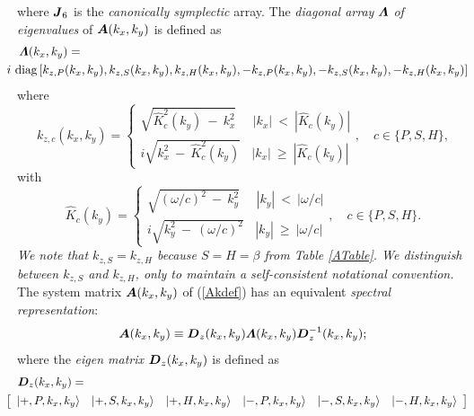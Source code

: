 \documentclass[11pt]{article}
\newcommand{\bmi}[1]{\mbox{\boldmath$\mit #1$\unboldmath}}
\begin{document}
where ${\bmi  J}_6$ is the {\em canonically symplectic\/} array.
The {\em diagonal array\/} ${\bmi
\Lambda}$ {\em of eigenvalues\/}  of ${\bmi  A}({k}_{x},{k}_{y})$ is defined as
\begin{eqnarray}	\label{eigDef}
\lefteqn{	{\bmi \Lambda}({k}_{x},{k}_{y}) =}\\
&&\!\!\!\!\!\!\!\!\!\!\!\!
i \ \mbox{diag} \left[{k}_{z,P
	}({k}_{x},{k}_{y}),{k}_{z,S }({k}_{x},{k}_{y}),{k}_{z,H }({k}_{x},{k}_{y}),
	-{k}_{z,P }({k}_{x},{k}_{y}),-{k}_{z,S }({k}_{x},{k}_{y}),
	-{k}_{z,H }({k}_{x},{k}_{y}) \right] \nonumber
\end{eqnarray}
where
\begin{equation}	\label{kzcDef}
	{k}_{z,c}({k}_{x},{k}_{y}) = \left\{
	\begin{array}{c}
	\sqrt {\hat{ K}_{c}^{2}({k}_{y})\ -\ {k}_{x}^{2}}\ \ \ \ \ \ |{k}_{x}|\ <\
	|\hat{K}_{c}({k}_{y})|\\
	i\sqrt {{k}_{x}^{ 2}\ -\ \hat{ K}_{c}^{2}({k}_{y})} \ \ \ \ |{k}_{x}|\ \ge   \
	|\hat{K}_{c}({k}_{y})|
\end{array}
\right. , \quad  c\in\{P,S,H\},
\end{equation}
with
\begin{equation}	\label{Kdef}
	\hat{K}_{c}({k}_{y}) = \left\{
	\begin{array}{c}
	\sqrt {(\omega/{c})^{2}\ -\ {k}_{y}^{2}}\ \ \ \ \ \ |{k}_{y}|\ <\
	|\omega/{c}|\\
	i\sqrt {{k}_{y}^{ 2}\ -\ (\omega/{c})^{2}} \ \ \ \ |{k}_{y}|\ \ge   \ |\omega/{c}|
\end{array} \right. , \quad  c\in\{P,S,H\}.
\end{equation}
{\em We note that ${k}_{z,S }={k}_{z,H }$
because $S=H=\beta$ from Table \ref{ATable}. We distinguish
between ${k}_{z,S }$ and ${k}_{z,H }$,  only to maintain a self-consistent
notational convention.\/}
 The system matrix ${\bmi  A}({k}_{x},{k}_{y})$ of (\ref{Akdef}) has an equivalent {\em
spectral representation\/}:
\begin{equation}	\label{specA}
	{\bmi  A}({k}_{x},{k}_{y}) \equiv {\bmi  D}_{z}({k}_{x},{k}_{y}){\bmi
	\Lambda }({k}_{x},{k}_{y}){\bmi  D}_{z}^{ -1}({k}_{x},{k}_{y});
\end{equation}
where the {\em eigen matrix\/} ${\bmi  D}_{z}({k}_{x},{k}_{y})$ is  defined as
\begin{eqnarray} \label{Ddef}
\lefteqn{{\bmi D}_{z}(k_{x},k_{y})=}\\
&&\!\!\!\!\!\!\!\!\!\!\!\!
\left[\begin{array}{cccccc}
\left|+,P, k_{x},k_{y}  \right\rangle&\left|+,S, k_{x},k_{y}
\right\rangle&\left|+,H, k_{x},k_{y}  \right\rangle&
\left|-,P, k_{x},k_{y}  \right\rangle&\left|-,S, k_{x},k_{y}
\right\rangle&\left|-,H, k_{x},k_{y}  \right\rangle
\end{array}\right]\nonumber
\end{eqnarray}
\end{document}
